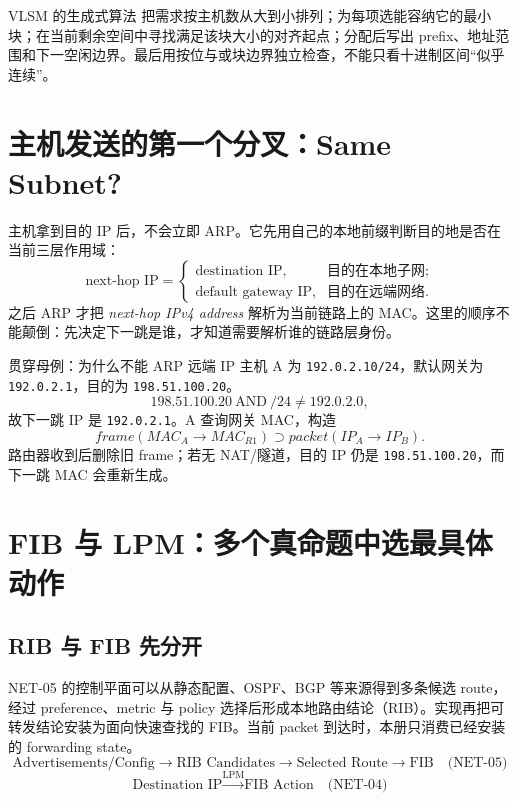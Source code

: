 \documentclass[11pt,a4paper]{ctexart}
\newcommand{\code}[1]{\texttt{#1}}
\begin{document}
\begin{methodbox}{VLSM 的生成式算法}
把需求按主机数从大到小排列；为每项选能容纳它的最小块；在当前剩余空间中寻找满足该块大小的对齐起点；分配后写出 prefix、地址范围和下一空闲边界。最后用按位与或块边界独立检查，不能只看十进制区间“似乎连续”。
\end{methodbox}

\section{主机发送的第一个分叉：Same Subnet?}

主机拿到目的 IP 后，不会立即 ARP。它先用自己的本地前缀判断目的地是否在当前三层作用域：
\[
\text{next-hop IP}=
\begin{cases}
\text{destination IP}, & \text{目的在本地子网};\\
\text{default gateway IP}, & \text{目的在远端网络}.
\end{cases}
\]
之后 ARP 才把 \emph{next-hop IPv4 address} 解析为当前链路上的 MAC。这里的顺序不能颠倒：先决定下一跳是谁，才知道需要解析谁的链路层身份。

\begin{examplebox}{贯穿母例：为什么不能 ARP 远端 IP}
主机 A 为 \code{192.0.2.10/24}，默认网关为 \code{192.0.2.1}，目的为 \code{198.51.100.20}。
\[
198.51.100.20\ \mathrm{AND}\ /24\ne192.0.2.0,
\]
故下一跳 IP 是 \code{192.0.2.1}。A 查询网关 MAC，构造
\[
frame(MAC_A\to MAC_{R1})
\supset
packet(IP_A\to IP_B).
\]
路由器收到后删除旧 frame；若无 NAT/隧道，目的 IP 仍是 \code{198.51.100.20}，而下一跳 MAC 会重新生成。
\end{examplebox}

\section{FIB 与 LPM：多个真命题中选最具体动作}

\subsection{RIB 与 FIB 先分开}

NET-05 的控制平面可以从静态配置、OSPF、BGP 等来源得到多条候选 route，经过 preference、metric 与 policy 选择后形成本地路由结论（RIB）。实现再把可转发结论安装为面向快速查找的 FIB。当前 packet 到达时，本册只消费已经安装的 forwarding state。
\[
\boxed{\text{Advertisements/Config}\to\text{RIB Candidates}\to\text{Selected Route}\to\text{FIB}}
\quad\text{(NET-05)}
\]
\[
\boxed{\text{Destination IP}\xrightarrow{\mathrm{LPM}}\text{FIB Action}}
\quad\text{(NET-04)}
\]
\end{document}
